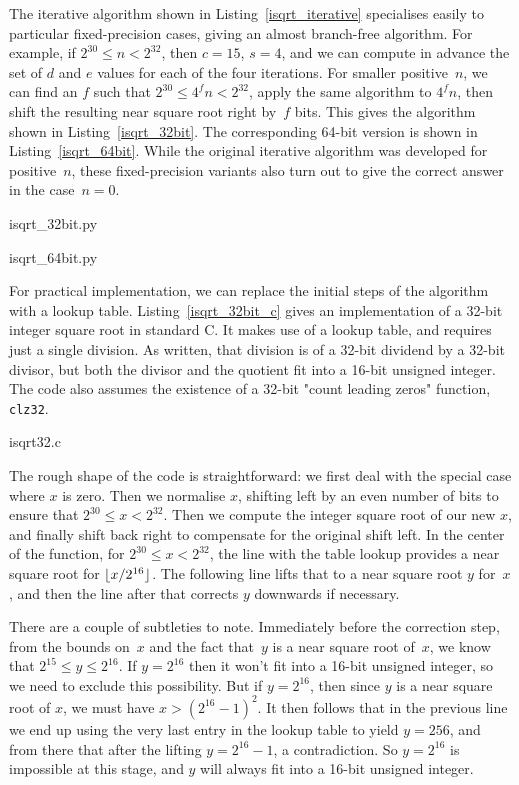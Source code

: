 \documentclass[a4paper]{article}
\DeclarePairedDelimiter\floor{\lfloor}{\rfloor}
\theoremstyle{plain}
\theoremstyle{definition}
\begin{document}
The iterative algorithm shown in Listing~\ref{isqrt_iterative} specialises
easily to particular fixed-precision cases, giving an almost branch-free
algorithm. For example, if $2^{30} \le n < 2^{32}$, then $c = 15$, $s=4$, and
we can compute in advance the set of $d$ and $e$ values for each of the four
iterations. For smaller positive~$n$, we can find an $f$ such that $2^{30} \le
4^f n < 2^{32}$, apply the same algorithm to $4^f n$, then shift the resulting
near square root right by~$f$ bits. This gives the algorithm shown in
Listing~\ref{isqrt_32bit}. The corresponding 64-bit version is shown in
Listing~\ref{isqrt_64bit}. While the original iterative algorithm was developed for
positive~$n$, these fixed-precision variants also turn out to give the correct
answer in the case~$n = 0$.


  {isqrt_32bit.py}


  {isqrt_64bit.py}

For practical implementation, we can replace the initial steps of the algorithm
with a lookup table. Listing~\ref{isqrt_32bit_c} gives an implementation of a
32-bit integer square root in standard C. It makes use of a lookup table, and
requires just a single division. As written, that division is of a 32-bit
dividend by a 32-bit divisor, but both the divisor and the quotient fit into a
16-bit unsigned integer. The code also assumes the existence of a 32-bit "count
leading zeros" function, \lstinline$clz32$.


  {isqrt32.c}

The rough shape of the code is straightforward: we first deal with
the special case where $x$ is zero. Then we normalise $x$, shifting left
by an even number of bits to ensure that $2^{30} \le x < 2^{32}$. Then
we compute the integer square root of our new $x$, and finally shift back
right to compensate for the original shift left. In the center of the function,
for $2^{30} \le x < 2^{32}$, the line with the table lookup provides a near
square root for $\floor{x / 2^{16}}$. The following line lifts that to a near
square root $y$ for~$x$, and then the line after that corrects $y$ downwards if
necessary.

There are a couple of subtleties to note. Immediately before the correction
step, from the bounds on~$x$ and the fact that~$y$ is a near square root
of~$x$, we know that $2^{15} \le y \le 2^{16}$. If $y = 2^{16}$ then it
won't fit into a 16-bit unsigned integer, so we need to exclude this
possibility. But if $y = 2^{16}$, then since $y$ is a near square root of $x$,
we must have $x > (2^{16} - 1)^2$. It then follows that in the previous line we
end up using the very last entry in the lookup table to yield $y = 256$, and
from there that after the lifting $y = 2^{16} - 1$, a contradiction. So $y =
2^{16}$ is impossible at this stage, and $y$ will always fit into a 16-bit
unsigned integer.
\end{document}

